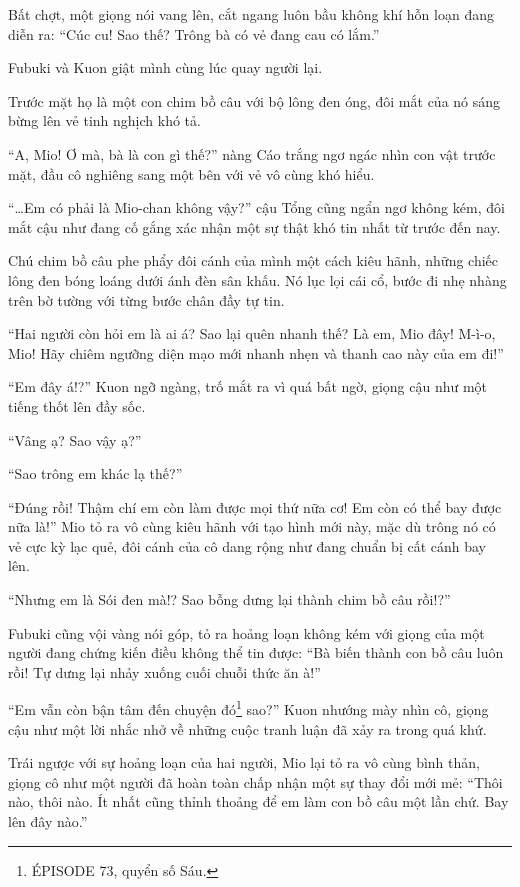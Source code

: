 \documentclass[../main.tex]{subfiles}
\begin{document}
Bất chợt, một giọng nói vang lên, cắt ngang luôn bầu không khí hỗn loạn đang diễn ra: ``Cúc cu! Sao thế? Trông bà có vẻ đang cau có lắm.''

Fubuki và Kuon giật mình cùng lúc quay người lại.

Trước mặt họ là một con chim bồ câu với bộ lông đen óng, đôi mắt của nó sáng bừng lên vẻ tinh nghịch khó tả.


``A, Mio! Ơ mà, bà là con gì thế?'' nàng Cáo trắng ngơ ngác nhìn con vật trước mặt, đầu cô nghiêng sang một bên với vẻ vô cùng khó hiểu.

``\dots Em có phải là Mio-chan không vậy?'' cậu Tổng cũng ngẩn ngơ không kém, đôi mắt cậu như đang cố gắng xác nhận một sự thật khó tin nhất từ trước đến nay.

Chú chim bồ câu phe phẩy đôi cánh của mình một cách kiêu hãnh, những chiếc lông đen bóng loáng dưới ánh đèn sân khấu. Nó lục lọi cái cổ, bước đi nhẹ nhàng trên bờ tường với từng bước chân đầy tự tin.

``Hai người còn hỏi em là ai á? Sao lại quên nhanh thế? Là em, Mio đây! M-ì-o, Mio! Hãy chiêm ngưỡng diện mạo mới nhanh nhẹn và thanh cao này của em đi!''

``Em đây á!?'' Kuon ngỡ ngàng, trố mắt ra vì quá bất ngờ, giọng cậu như một tiếng thốt lên đầy sốc.

``Vâng ạ? Sao vậy ạ?''

``Sao trông em khác lạ thế?''

``Đúng rồi! Thậm chí em còn làm được mọi thứ nữa cơ! Em còn có thể bay được nữa là!'' Mio tỏ ra vô cùng kiêu hãnh với tạo hình mới này, mặc dù trông nó có vẻ cực kỳ lạc quẻ, đôi cánh của cô dang rộng như đang chuẩn bị cất cánh bay lên.

``Nhưng em là Sói đen mà!? Sao bỗng dưng lại thành chim bồ câu rồi!?''

Fubuki cũng vội vàng nói góp, tỏ ra hoảng loạn không kém với giọng của một người đang chứng kiến điều không thể tin được: ``Bà biến thành con bồ câu luôn rồi! Tự dưng lại nhảy xuống cuối chuỗi thức ăn à!''

``Em vẫn còn bận tâm đến chuyện đó\footnote{{\flaregothic ÉPISODE 73}, quyển số Sáu.} sao?'' Kuon nhướng mày nhìn cô, giọng cậu như một lời nhắc nhở về những cuộc tranh luận đã xảy ra trong quá khứ.

Trái ngược với sự hoảng loạn của hai người, Mio lại tỏ ra vô cùng bình thản, giọng cô như một người đã hoàn toàn chấp nhận một sự thay đổi mới mẻ: ``Thôi nào, thôi nào. Ít nhất cũng thỉnh thoảng để em làm con bồ câu một lần chứ. Bay lên đây nào.''
\end{document}

